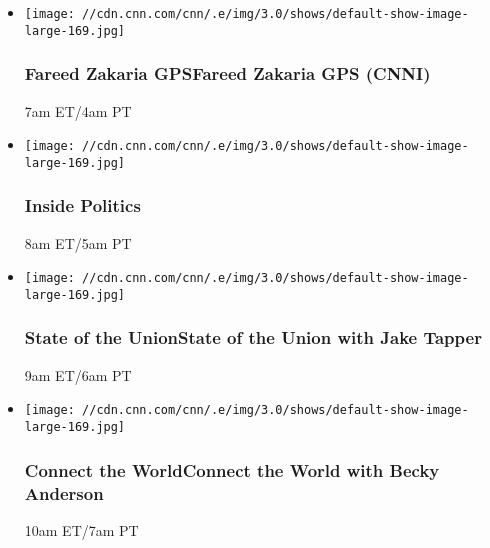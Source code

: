 \begin{itemize}
\item
  \texttt{[image: //cdn.cnn.com/cnn/.e/img/3.0/shows/default-show-image-large-169.jpg]}

  \hypertarget{fareed-zakaria-gpsfareed-zakaria-gps-cnni--1}{%
  \subsubsection{Fareed Zakaria GPSFareed Zakaria GPS (CNNI)
  }\label{fareed-zakaria-gpsfareed-zakaria-gps-cnni--1}}

  7am ET/4am PT
\end{itemize}

\begin{itemize}
\item
  \texttt{[image: //cdn.cnn.com/cnn/.e/img/3.0/shows/default-show-image-large-169.jpg]}

  \hypertarget{inside-politics}{%
  \subsubsection{Inside Politics}\label{inside-politics}}

  8am ET/5am PT
\end{itemize}

\begin{itemize}
\item
  \texttt{[image: //cdn.cnn.com/cnn/.e/img/3.0/shows/default-show-image-large-169.jpg]}

  \hypertarget{state-of-the-unionstate-of-the-union-with-jake-tapper-}{%
  \subsubsection{State of the UnionState of the Union with Jake Tapper
  }\label{state-of-the-unionstate-of-the-union-with-jake-tapper-}}

  9am ET/6am PT
\end{itemize}

\begin{itemize}
\item
  \texttt{[image: //cdn.cnn.com/cnn/.e/img/3.0/shows/default-show-image-large-169.jpg]}

  \hypertarget{connect-the-worldconnect-the-world-with-becky-anderson-}{%
  \subsubsection{Connect the WorldConnect the World with Becky Anderson
  }\label{connect-the-worldconnect-the-world-with-becky-anderson-}}

  10am ET/7am PT
\end{itemize}

